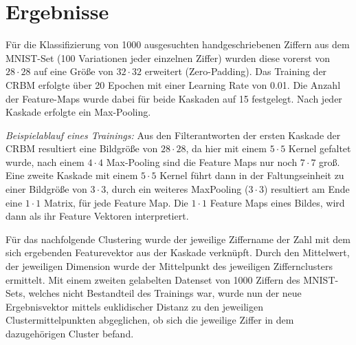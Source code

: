 \section{Ergebnisse}\label{results}
Für die Klassifizierung von 1000 ausgesuchten handgeschriebenen Ziffern aus dem MNIST-Set (100 Variationen jeder einzelnen Ziffer) wurden diese vorerst von $28 \cdot 28$ auf eine Größe von $32 \cdot 32$ erweitert (Zero-Padding). Das Training der CRBM erfolgte über 20 Epochen mit einer Learning Rate von 0.01. Die Anzahl der Feature-Maps wurde dabei für beide Kaskaden auf 15 festgelegt.
Nach jeder Kaskade erfolgte ein Max-Pooling. 
\newline 

\textit{Beispielablauf eines Trainings:}
Aus den Filterantworten der ersten Kaskade der CRBM resultiert eine Bildgröße von $28 \cdot 28$, da hier mit einem $5 \cdot 5$ Kernel gefaltet wurde, nach einem $4 \cdot 4$ Max-Pooling sind die Feature Maps nur noch $7 \cdot 7$ groß. Eine zweite Kaskade mit einem  $5 \cdot 5$ Kernel führt dann in der Faltungseinheit zu einer Bildgröße von $3 \cdot 3$, durch ein weiteres MaxPooling ($3 \cdot 3$) resultiert am Ende eine $1 \cdot 1$ Matrix, für jede Feature Map. Die $1 \cdot 1$ Feature Maps eines Bildes, wird dann als ihr Feature Vektoren interpretiert.

Für das nachfolgende Clustering wurde der jeweilige Ziffername der Zahl mit dem sich ergebenden Featurevektor aus der Kaskade verknüpft. Durch den Mittelwert, der jeweiligen Dimension wurde der Mittelpunkt des jeweiligen Ziffernclusters ermittelt.
Mit einem zweiten gelabelten Datenset von 1000 Ziffern des MNIST-Sets, welches nicht Bestandteil des Trainings war, wurde nun der neue Ergebnisvektor mittels euklidischer Distanz zu den jeweiligen Clustermittelpunkten abgeglichen, ob sich die jeweilige Ziffer in dem dazugehörigen Cluster befand.

